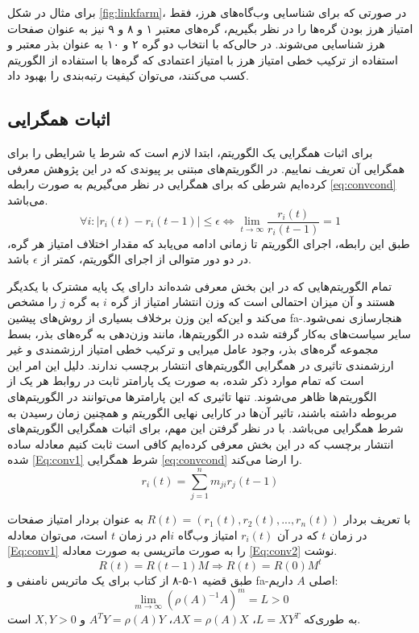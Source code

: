 \documentclass[twoside, a4paper,11pt]{book}
\numberwithin{equation}{chapter}
\numberwithin{table}{chapter}
\numberwithin{figure}{chapter}
\numberwithin{equation}{chapter}
\newcommand{\mls}[1]{\gls{fa-#1}\glsuseri{la-#1}}
\begin{document}
برای مثال در شکل \ref{fig:linkfarm}، در صورتی که برای شناسایی وب‌گاه‌های هرز، فقط امتیاز هرز بودن گره‌ها را در نظر بگیریم، گره‌های معتبر ۱ و ۸ و ۹ نیز به عنوان صفحات هرز شناسایی می‌شوند. در حالی‌که با انتخاب دو گره ۲ و ۱۰ به عنوان بذر معتبر و استفاده از ترکیب خطی امتیاز هرز با امتیاز اعتمادی که گره‌ها با استفاده از الگوریتم  کسب می‌کنند، می‌توان کیفیت رتبه‌بندی را بهبود داد.
\subsection{اثبات همگرایی}
\label{section:linkbased-convergence}
برای اثبات همگرایی یک الگوریتم، ابتدا لازم است که شرط یا شرایطی را برای همگرایی آن تعریف نماییم. در الگوریتم‌های مبتنی بر پیوندی که در این پژوهش معرفی کرده‌ایم شرطی که برای همگرایی در نظر می‌گیریم به صورت رابطه \ref{eq:convcond} می‌باشد.
\begin{equation}
	\forall i : |r_i(t) - r_i(t-1)| \leq \epsilon    \Longleftrightarrow    \lim_{t \to \infty} \frac{r_i(t)}{r_i(t-1)} = 1
	\label{eq:convcond}
\end{equation}
طبق این رابطه، اجرای الگوریتم تا زمانی ادامه می‌یابد که مقدار اختلاف امتیاز هر گره، در دو دور متوالی از اجرای الگوریتم، کمتر از $\epsilon$ باشد. 

تمام الگوریتم‌هایی که در این بخش معرفی شده‌اند دارای یک پایه مشترک با یکدیگر هستند و آن میزان احتمالی است که وزن انتشار امتیاز از گره $i$ به گره $j$ را مشخص می‌کند و این‌که این وزن برخلاف بسیاری از روش‌های پیشین \mls{هنجارسازی} نمی‌شود. سایر سیاست‌‌های به‌کار گرفته شده در الگوریتم‌ها، مانند وزن‌دهی به گره‌های بذر، بسط مجموعه گره‌های بذر، وجود عامل میرایی و ترکیب خطی امتیاز ارزشمندی و غیر ارزشمندی تاثیری در همگرایی الگوریتم‌های انتشار برچسب ندارند. دلیل این امر این است که تمام موارد ذکر شده، به صورت یک پارامتر ثابت در روابط هر یک از الگوریتم‌ها ظاهر می‌شوند. تنها تاثیری که این پارامترها می‌توانند در الگوریتم‌های مربوطه داشته باشند، تاثیر آن‌‌ها در کارایی نهایی الگوریتم و همچنین زمان رسیدن به شرط همگرایی می‌باشد. با در نظر گرفتن این مهم، برای اثبات همگرایی الگوریتم‌های انتشار برچسب که در این بخش معرفی کرده‌ایم کافی است ثابت کنیم معادله ساده شده \ref{Eq:conv1} شرط همگرایی \ref{eq:convcond} را ارضا می‌کند. 
 \begin{equation}
r_{i}(t) = \sum\limits_{j=1}^n {m_{ji}} {r_{j}(t-1)}		
	\label{Eq:conv1}
\end{equation}

با تعریف بردار $R(t)=(r_1(t), r_2(t), ..., r_n(t))$ به عنوان بردار امتیاز صفحات در زمان $t$ که در آن $r_i(t)$ امتیاز وب‌گاه $i$ام در زمان $t$ است، می‌توان معادله \ref{Eq:conv1} را به صورت ماتریسی به صورت معادله \ref{Eq:conv2} نوشت. 
\begin{equation}
R(t) = {R(t-1)} {M}   \Longrightarrow   R(t) = {R(0)} {M^t}			
	\label{Eq:conv2}
\end{equation} 
طبق قضیه ۱-۵-۸ از کتاب \cite{horn2012matrix} برای یک ماتریس نامنفی و \mls{اصلی} $A$ داریم:
\begin{equation}
\lim_{m \to \infty}(\rho(A)^{-1} A)^m = L > 0
	\label{Eq:theorem}
\end{equation}
به طوری‌که $L=XY^T$، $AX=\rho(A)X$، $A^TY= \rho(A)Y$ و $X,Y>0$ است.
\end{document}
